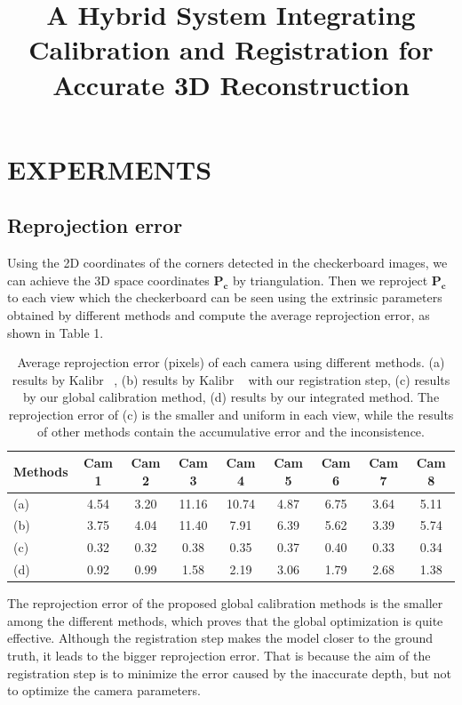\documentclass{article}
\begin{document}
\sloppy

\def\x{{\mathbf x}}
\def\L{{\cal L}}


\title{A Hybrid System Integrating Calibration and Registration for Accurate 3D Reconstruction}
%
\address{University of Science and Technology of China}


\maketitle



\section{EXPERMENTS}

\subsection{Reprojection error}
Using the 2D coordinates of the corners detected in the checkerboard images, we can achieve the 3D space coordinates $\mathbf{P_{c}}$ by triangulation. Then we reproject $\mathbf{P_{c}}$ to each view which the checkerboard can be seen using the extrinsic parameters obtained by different methods and compute the average reprojection error, as shown in Table 1.
\begin{table}
	\centering
	\caption{Average reprojection error (pixels) of each camera using different methods. (a) results by Kalibr ~\cite{Maye2013Self}, (b) results by Kalibr ~\cite{Maye2013Self} with our registration step, (c) results by our global calibration method, (d) results by our integrated method. The reprojection error of (c) is the smaller and uniform in each view, while the results of other methods contain the accumulative error and the inconsistence. }
	\label{tab:reprojection}
	\begin{tabular}{lcccccccc}
		\hline
		Methods & Cam 1 & Cam 2 & Cam 3 & Cam 4 & Cam 5 & Cam 6 & Cam 7 & Cam 8\\
		\hline
		(a) &4.54 &3.20 &11.16 &10.74 &4.87 &6.75 &3.64 &5.11\\

		(b) &3.75 &4.04 &11.40 &7.91 &6.39 &5.62 &3.39 &5.74\\
		
		(c) &0.32 &0.32 &0.38  &0.35 &0.37 &0.40 &0.33 &0.34 \\
		
		(d) &0.92 &0.99 &1.58 &2.19 &3.06 &1.79 &2.68 &1.38\\
		\hline
		
	\end{tabular}


\end{table}
The reprojection error of the proposed global calibration methods is the smaller among the different methods, which proves that the global optimization is quite effective. Although the registration step makes the model closer to the ground truth, it leads to the bigger reprojection error. That is because the aim of the registration step is to minimize the error caused by the inaccurate depth, but not to optimize the camera parameters.
\end{document}
